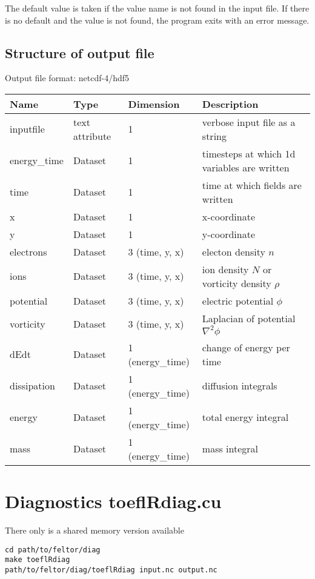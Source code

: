 The default value is taken if the value name is not found in the input file. If there is no default and
the value is not found,
the program exits with an error message.

\subsection{Structure of output file}
Output file format: netcdf-4/hdf5
%
\begin{longtable}{lll>{\RaggedRight}p{7cm}}
\toprule
\rowcolor{gray!50}\textbf{Name} &  \textbf{Type} & \textbf{Dimension} & \textbf{Description}  \\ \midrule
inputfile  &             text attribute & 1 & verbose input file as a string \\
energy\_time             & Dataset & 1 & timesteps at which 1d variables are written \\
time                     & Dataset & 1 & time at which fields are written \\
x                        & Dataset & 1 & x-coordinate  \\
y                        & Dataset & 1 & y-coordinate \\
electrons                & Dataset & 3 (time, y, x) & electon density $n$ \\
ions                     & Dataset & 3 (time, y, x) & ion density $N$ or vorticity density $\rho$  \\
potential                & Dataset & 3 (time, y, x) & electric potential $\phi$  \\
vorticity                & Dataset & 3 (time, y, x) & Laplacian of potential $\nabla^2\phi$  \\
dEdt                     & Dataset & 1 (energy\_time) & change of energy per time  \\
dissipation              & Dataset & 1 (energy\_time) & diffusion integrals  \\
energy                   & Dataset & 1 (energy\_time) & total energy integral  \\
mass                     & Dataset & 1 (energy\_time) & mass integral   \\
\bottomrule
\end{longtable}
\section{Diagnostics toeflRdiag.cu}
There only is a shared memory version available
\begin{verbatim}
cd path/to/feltor/diag
make toeflRdiag
path/to/feltor/diag/toeflRdiag input.nc output.nc
\end{verbatim}

